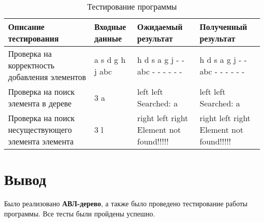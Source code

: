 \begin{center}
	
	\begin{table}[h!]
		\caption{Тестирование программы}
		\label{tab1}
		\centering
		\begin{tabular}{|m{3cm}|m{1.5cm}|m{5cm}|m{5cm}|}
			
			\hline
			Описание тестирования & 
			Входные данные & 
			Ожидаемый   результат &
			Полученный    результат \\ 
			\hline
			
			Проверка на корректность добавления элементов &
			
			a \newline
			s \newline
			d \newline
			g \newline
			h \newline
			j \newline
			abc &
			                  h\newline
				   d          s\newline 
			   a     g   j    -\newline
			-   abc - - - - - -\newline
			 &
			h\newline
			d          s\newline
			a     g   j    -\newline
			-   abc - - - - - -\newline \\
			\hline
			
			Проверка на поиск элемента в дереве &
			3 \newline
			a &
			left left
			Searched: a &
			left left
			Searched: a\\
			\hline
			
			Проверка на поиск несуществующего элемента элемента &
			3 \newline
			l &
			right left right Element not found!!!!! &
			right left right Element not found!!!!!\\
			\hline
			
		\end{tabular}
		
	\end{table}
	
\end{center}
\section*{Вывод}
Было реализовано \textbf{АВЛ-дерево}, а также было проведено тестирование работы программы. Все тесты были пройдены успешно.
\clearpage

